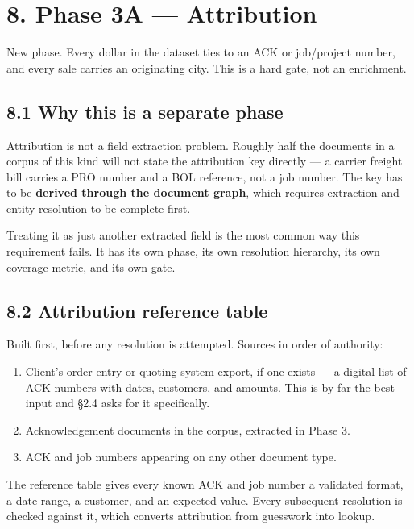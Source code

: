 \documentclass[
]{article}
\providecommand{\tightlist}{%
  \setlength{\itemsep}{0pt}\setlength{\parskip}{0pt}}
\begin{document}
\section{8. Phase 3A --- Attribution}\label{phase-3a-attribution}

New phase. Every dollar in the dataset ties to an ACK or job/project
number, and every sale carries an originating city. This is a hard gate,
not an enrichment.

\subsection{8.1 Why this is a separate
phase}\label{why-this-is-a-separate-phase}

Attribution is not a field extraction problem. Roughly half the
documents in a corpus of this kind will not state the attribution key
directly --- a carrier freight bill carries a PRO number and a BOL
reference, not a job number. The key has to be \textbf{derived through
the document graph}, which requires extraction and entity resolution to
be complete first.

Treating it as just another extracted field is the most common way this
requirement fails. It has its own phase, its own resolution hierarchy,
its own coverage metric, and its own gate.

\subsection{8.2 Attribution reference
table}\label{attribution-reference-table}

Built first, before any resolution is attempted. Sources in order of
authority:

\begin{enumerate}
\def\labelenumi{\arabic{enumi}.}
\tightlist
\item
  Client's order-entry or quoting system export, if one exists --- a
  digital list of ACK numbers with dates, customers, and amounts. This
  is by far the best input and §2.4 asks for it specifically.
\item
  Acknowledgement documents in the corpus, extracted in Phase 3.
\item
  ACK and job numbers appearing on any other document type.
\end{enumerate}

The reference table gives every known ACK and job number a validated
format, a date range, a customer, and an expected value. Every
subsequent resolution is checked against it, which converts attribution
from guesswork into lookup.
\end{document}
